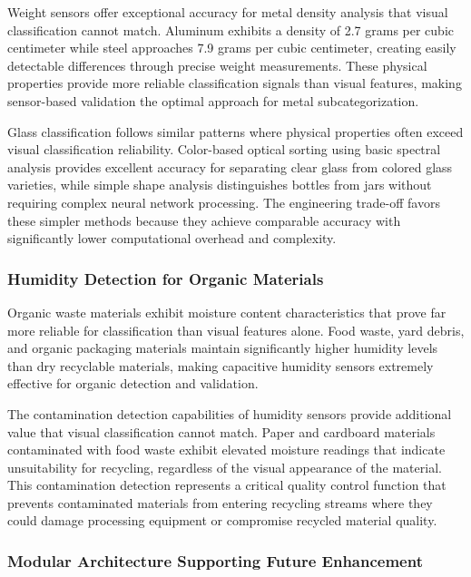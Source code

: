 \documentclass[11pt, a4paper]{article}
\begin{document}
Weight sensors offer exceptional accuracy for metal density analysis that visual classification cannot match. Aluminum exhibits a density of 2.7 grams per cubic centimeter while steel approaches 7.9 grams per cubic centimeter, creating easily detectable differences through precise weight measurements. These physical properties provide more reliable classification signals than visual features, making sensor-based validation the optimal approach for metal subcategorization.

Glass classification follows similar patterns where physical properties often exceed visual classification reliability. Color-based optical sorting using basic spectral analysis provides excellent accuracy for separating clear glass from colored glass varieties, while simple shape analysis distinguishes bottles from jars without requiring complex neural network processing. The engineering trade-off favors these simpler methods because they achieve comparable accuracy with significantly lower computational overhead and complexity.

\subsubsection{Humidity Detection for Organic Materials}

Organic waste materials exhibit moisture content characteristics that prove far more reliable for classification than visual features alone. Food waste, yard debris, and organic packaging materials maintain significantly higher humidity levels than dry recyclable materials, making capacitive humidity sensors extremely effective for organic detection and validation.

The contamination detection capabilities of humidity sensors provide additional value that visual classification cannot match. Paper and cardboard materials contaminated with food waste exhibit elevated moisture readings that indicate unsuitability for recycling, regardless of the visual appearance of the material. This contamination detection represents a critical quality control function that prevents contaminated materials from entering recycling streams where they could damage processing equipment or compromise recycled material quality.

\subsubsection{Modular Architecture Supporting Future Enhancement}
\end{document}
